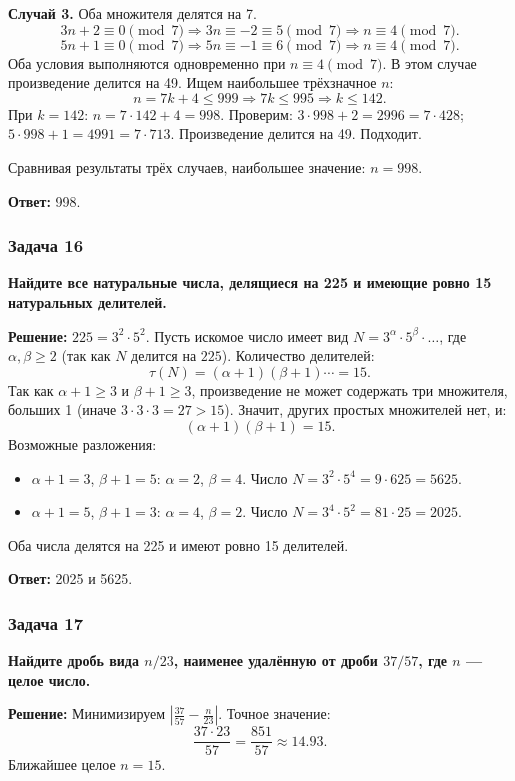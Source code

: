 \documentclass[12pt, a4paper]{article}
\begin{document}
\textbf{Случай 3.} Оба множителя делятся на 7.
\[
3n + 2 \equiv 0 \pmod{7} \Rightarrow 3n \equiv -2 \equiv 5 \pmod{7} \Rightarrow n \equiv 4 \pmod{7}.
\]
\[
5n + 1 \equiv 0 \pmod{7} \Rightarrow 5n \equiv -1 \equiv 6 \pmod{7} \Rightarrow n \equiv 4 \pmod{7}.
\]
Оба условия выполняются одновременно при $n \equiv 4 \pmod{7}$. В этом случае произведение делится на 49. Ищем наибольшее трёхзначное $n$:
\[
n = 7k + 4 \le 999 \Rightarrow 7k \le 995 \Rightarrow k \le 142.
\]
При $k = 142$: $n = 7 \cdot 142 + 4 = 998$. Проверим: $3 \cdot 998 + 2 = 2996 = 7 \cdot 428$; $5 \cdot 998 + 1 = 4991 = 7 \cdot 713$. Произведение делится на 49. Подходит.

Сравнивая результаты трёх случаев, наибольшее значение: $n = 998$.

\textbf{Ответ:} 998.

\subsubsection*{Задача 16}
\textbf{Найдите все натуральные числа, делящиеся на 225 и имеющие ровно 15 натуральных делителей.}

\textbf{Решение:}
$225 = 3^2 \cdot 5^2$. Пусть искомое число имеет вид $N = 3^{\alpha} \cdot 5^{\beta} \cdot \ldots$, где $\alpha, \beta \ge 2$ (так как $N$ делится на $225$). Количество делителей:
\[
\tau(N) = (\alpha+1)(\beta+1)\cdots = 15.
\]
Так как $\alpha+1 \ge 3$ и $\beta+1 \ge 3$, произведение не может содержать три множителя, больших 1 (иначе $3 \cdot 3 \cdot 3 = 27 > 15$). Значит, других простых множителей нет, и:
\[
(\alpha+1)(\beta+1) = 15.
\]
Возможные разложения:
\begin{itemize}
    \item $\alpha+1 = 3$, $\beta+1 = 5$: $\alpha = 2$, $\beta = 4$. Число $N = 3^2 \cdot 5^4 = 9 \cdot 625 = 5625$.
    \item $\alpha+1 = 5$, $\beta+1 = 3$: $\alpha = 4$, $\beta = 2$. Число $N = 3^4 \cdot 5^2 = 81 \cdot 25 = 2025$.
\end{itemize}
Оба числа делятся на 225 и имеют ровно 15 делителей.

\textbf{Ответ:} 2025 и 5625.

\subsubsection*{Задача 17}
\textbf{Найдите дробь вида $n/23$, наименее удалённую от дроби $37/57$, где $n$ — целое число.}

\textbf{Решение:}
Минимизируем $\left|\frac{37}{57} - \frac{n}{23}\right|$. Точное значение:
\[
\frac{37 \cdot 23}{57} = \frac{851}{57} \approx 14.93.
\]
Ближайшее целое $n = 15$.
\end{document}
